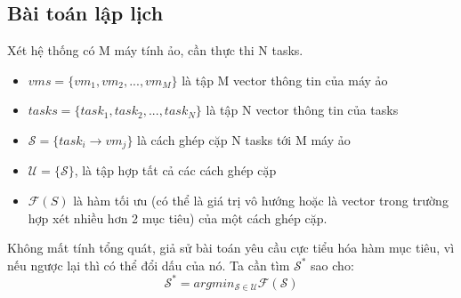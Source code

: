 \documentclass{my_style}
\begin{document}
\subsection*{Bài toán lập lịch}
Xét hệ thống có M máy tính ảo, cần thực thi N tasks.
\begin{itemize}
	\item $vms = \{vm_{1}, vm_{2}, ..., vm_{M}\}$ là tập M vector thông tin của máy ảo
	\item $tasks = \{task_{1}, task_{2}, ..., task_{N}\}$ là tập N vector thông tin của tasks
	\item $\mathcal{S} = \{task_{i} \rightarrow vm_{j}\}$ là cách ghép cặp N tasks tới M máy ảo
	\item $\mathcal{U} = \{\mathcal{S}\}$, là tập hợp tất cả các cách ghép cặp
	\item $\mathcal{F}(S)$ là hàm tối ưu (có thể là giá trị vô hướng hoặc là vector trong trường hợp xét nhiều hơn 2 mục tiêu) của một cách ghép cặp.
\end{itemize}
Không mất tính tổng quát, giả sử bài toán yêu cầu cực tiểu hóa hàm mục tiêu, vì nếu ngược lại thì có thể đổi dấu của nó. Ta cần tìm $\mathcal{S^{*}}$ sao cho: 
\begin{equation}
	\mathcal{S^{*}} = argmin_{\mathcal{S} \in \mathcal{U}}\mathcal{F}(\mathcal{S})
\end{equation}
\end{document}
